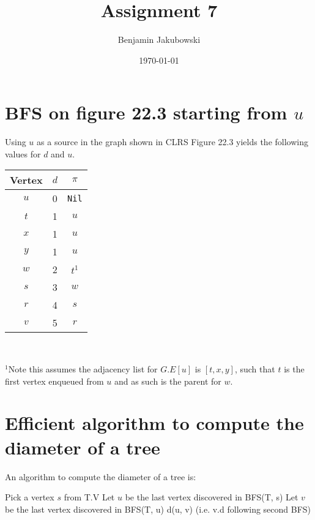 \documentclass[paper=a4, fontsize=11pt]{scrartcl} %
\title{	Assignment 7}
\author{Benjamin Jakubowski} %
\date{\normalsize\today} %
\numberwithin{equation}{section} %
\numberwithin{figure}{section} %
\numberwithin{table}{section} %
\begin{document}
\maketitle %

\section{BFS on figure 22.3 starting from $u$}

Using $u$ as a source in the graph shown in CLRS Figure 22.3 yields the following values for $d$ and $u$.

\begin{center}
\begin{tabular}{| c | c | c |}
\hline
	Vertex & $d$ & $\pi$ \\
\hline
	$u$ & 0 & \texttt{Nil} \\
\hline
	$t$ & 1 & $u$ \\
\hline
	$x$ & 1 & $u$ \\
\hline
	$y$ & 1 & $u$ \\
\hline
	$w$ & 2 & $t^1$ \\
\hline
	$s$ & 3 & $w$\\
\hline
	$r$ & 4 & $s$ \\
\hline
	$v$ & 5 & $r$ \\
\hline
\end{tabular} \\
\end{center}
$^1$Note this assumes the adjacency list for $G.E[u]$ is $[t, x, y]$, such that $t$ is the first vertex enqueued from $u$ and as such is the parent for $w$.


\section{Efficient algorithm to compute the diameter of a tree}

An algorithm to compute the diameter of a tree is:

\begin{algorithmic}
	\State Pick a vertex $s$ from T.V
	\State Let $u$ be the last vertex discovered in BFS(T, s)
	\State Let $v$ be the last vertex discovered in BFS(T, u)
	\State \Return d(u, v) (i.e. v.d following second BFS)
\EndFunction
\end{algorithmic}
\end{document}
